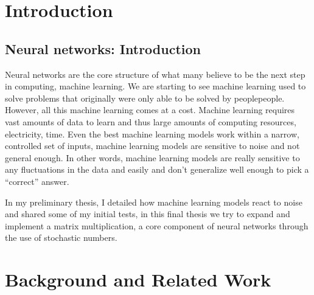 \documentclass[a4paper,oneside,phd,etd]{BYUPhys}
\begin{document}
 \frontmatter


 \makepreliminarypages


\doublespace
%

%

 \clearemptydoublepage
\singlespace
 \tableofcontents

\clearemptydoublepage
\listoffigures

\clearemptydoublepage

\clearemptydoublepage

\mainmatter
%
\chapter{Introduction}
\label{chap:Introduction}


\section{Neural networks: Introduction}
Neural networks are the core structure of what many believe to be the next step in computing, machine learning. We are starting to see machine learning used to solve problems that originally were only able to be solved by peoplepeople\cite{bojarski2016end}. However, all this machine learning comes at a cost. Machine learning requires vast amounts of data to learn and thus large amounts of computing resources, electricity, time. Even the best machine learning models work within a narrow, controlled set of inputs, machine learning models are sensitive to noise and not general enough. In other words, machine learning models are really sensitive to any fluctuations in the data and easily and don’t generalize well enough to pick a “correct” answer.

In my preliminary thesis, I detailed how machine learning models react to noise and shared some of my initial tests, in this final thesis we try to expand and implement a matrix multiplication, a core component of neural networks through the use of stochastic numbers.

\chapter{Background and Related Work}
\end{document}
